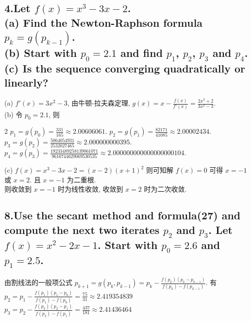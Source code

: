 \documentclass{ctexart}
\begin{document}
\begin{flushleft}
    \subsection*{4.Let $f(x)=x^3-3x-2$. \\
    (a) Find the Newton-Raphson formula $p_k=g(p_{k-1})$. \\
    (b) Start with $p_0=2.1$ and find $p_1$, $p_2$, $p_3$ and $p_4$. \\
    (c) Is the sequence converging quadratically or linearly?}
    (a) $f'(x)=3x^2-3$, 由牛顿-拉夫森定理, $\displaystyle g(x)=x-\frac{f(x)}{f'(x)}=\frac{2x^3+2}{3x^2-3}$. \\
    (b) 令 $p_0=2.1$, 则 \\
    \begin{spacing}{2}
    \qquad $\displaystyle p_1=g(p_0)=\frac{331}{165}\approx2.00606061$. \qquad $\displaystyle p_2=g(p_1)=\frac{82171}{41085}\approx2.00002434$. \\
    \qquad $\displaystyle p_3=g(p_2)=\frac{5064054931}{2532027465}\approx2.000000000395$. \qquad $\displaystyle p_4=g(p_3)=\frac{19233489258139061071}{9616744629069530535}\approx2.000000000000000000104$. \\
    \end{spacing}
    (c) $f(x)=x^3-3x-2=(x-2)(x+1)^2$ 则可知解 $f(x)=0$ 可得 $x=-1$ 或 $x=2$. 且 $x=-1$ 为二重根. \\
    \qquad 则收敛到 $x=-1$ 时为线性收敛, 收敛到 $x=2$ 时为二次收敛.

    \subsection*{8.Use the secant method and formula(27) and compute the next two iterates $p_2$ and $p_3$. Let $f(x)=x^2-2x-1$. Start with $p_0=2.6$ and $p_1=2.5$.}
    由割线法的一般项公式 $\displaystyle p_{k+1}=g(p_k,p_{k-1})=p_k-\frac{f(p_k)(p_k-p_{k-1})}{f(p_k)-f(p_{k-1})}$. 有 \\
    \quad $\displaystyle p_2=p_1-\frac{f(p_1)(p_1-p_0)}{f(p_1)-f(p_0)}=\frac{75}{31}\approx2.419354839$ \\
    \quad $\displaystyle p_3=p_2-\frac{f(p_2)(p_2-p_1)}{f(p_2)-f(p_1)}=\frac{437}{181}\approx2.41436464$

\end{flushleft}
\end{document}
